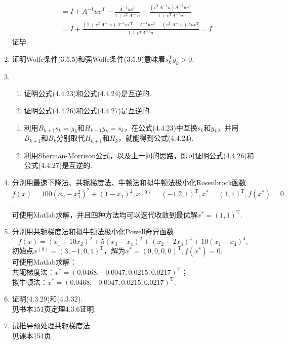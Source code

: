 \begin{enumerate}
\begin{align*}
        & = I+A^{-1}uv^\mathrm{T}-\frac{A^{-1}uv^\mathrm{T}}{1+v^\mathrm{T}A^{-1}u}-\frac{(v^\mathrm{T}A^{-1}u)A^{-1}uv^\mathrm{T}}{1+v^\mathrm{T}A^{-1}u} \\
        & = I + \frac{(1+v^\mathrm{T}A^{-1}u)A^{-1}uv^\mathrm{T}-A^{-1}uv^\mathrm{T}-(v^\mathrm{T}A^{-1}u)Auv^\mathrm{T}}{1+v^\mathrm{T}A^{-1}u} = I
    \end{align*}
    证毕.
    \item 证明Wolfe条件(3.5.5)和强Wolfe条件(3.5.9)意味着$s_k^\mathrm{T}y_k>0$.\\
    \omitted
    \item \begin{enumerate}[label=(\arabic*)]
        \item 证明公式(4.4.23)和公式(4.4.24)是互逆的.
        \item 证明公式(4.4.26)和公式(4.4.27)是互逆的.
    \end{enumerate}
    \pro
    \begin{enumerate}[label=(\arabic*)]
        \item 利用$B_{k+1}s_k=y_k$和$H_{k+1}y_k=s_k$，在公式(4.4.23)中互换$s_k$和$y_k$，并用$B_{k+1}$和$B_k$分别取代$H_{k+1}$和$H_k$，就能得到公式(4.4.24).
        \item 利用Sherman-Morrison公式，以及上一问的思路，即可证明公式(4.4.26)和公式(4.4.27)是互逆的.
    \end{enumerate}
    \item 分别用最速下降法、共轭梯度法、牛顿法和拟牛顿法极小化Rosenbrock函数$f(x)=100(x_2-x_1^2)^2+(1-x_1)^2,x^{(0)}=(-1.2,1)^\mathrm{T},x^*=(1,1)^\mathrm{T},f(x^*)=0$.\\
    \sol 可使用Matlab求解，并且四种方法均可以迭代收敛到最优解$x^*=(1,1)^\mathrm{T}$.
    \item 分别用共轭梯度法和拟牛顿法极小化Powell奇异函数\[f(x)=(x_1+10x_2)^2+5(x_3-x_4)^2+(x_2-2x_3)^4+10(x_1-x_4)^4,\]
    初始点$x^{(0)}=(3,-1,0,1)^\mathrm{T}$，解为$x^*=(0,0,0,0)^\mathrm{T},f(x^*)=0$.\\
    \sol 可使用Matlab求解：\\
    共轭梯度法：$x^*=(0.0468,-0.0047,0.0215,0.0217)^{\mathrm{T}}$；\\
    拟牛顿法：$x^*=(0.0468,-0.0047,0.0215,0.0217)^{\mathrm{T}}$.
    \item 证明(4.3.29)和(4.3.32).\\
    \pro 见书本151页定理4.3.6证明.
    \item 试推导预处理共轭梯度法.\\
    \sol 见课本154页.

\end{enumerate}
